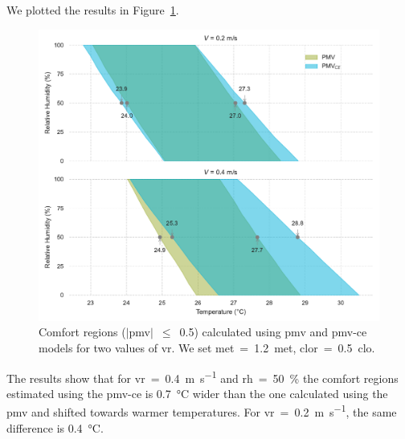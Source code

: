 We plotted the results in Figure~\ref{fig:comfort_regios_pmv_pmvce}.
\begin{figure}[!htb]
    \centering
    \includegraphics[width=1\textwidth]{figures/pmv_comfort_regions}
    \caption{Comfort regions ($|$\ac{pmv}$|$~$\leq$~\num{0.5}) calculated using \ac{pmv} and \ac{pmv-ce} models for two values of \ac{vr}.
    We set \ac{met}~=~\qty{1.2}{met}, \ac{clor}~=~\qty{0.5}{clo}.
    \label{fig:comfort_regios_pmv_pmvce}}
\end{figure}
The results show that for \ac{vr}~=~\qty{0.4}{\m\per\s} and \ac{rh}~=~\qty{50}{\percent} the comfort regions estimated using the \ac{pmv-ce} is \qty{0.7}{\celsius} wider than the one calculated using the \ac{pmv} and shifted towards warmer temperatures.
For \ac{vr}~=~\qty{0.2}{\m\per\s}, the same difference is \qty{0.4}{\celsius}.

